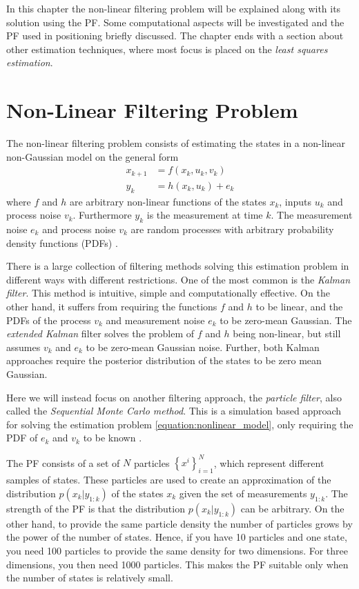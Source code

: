 \documentclass{LTHthesis}
\begin{document}
In this chapter the non-linear filtering problem will be explained along with its solution using the PF. Some computational aspects will be investigated and the PF used in positioning briefly discussed. The chapter ends with a section about other estimation techniques, where most focus is placed on the \emph{least squares estimation}.
%
\section{Non-Linear Filtering Problem}
\label{sec:nlfp}
The non-linear filtering problem consists of estimating the states in a non-linear non-Gaussian model on the general form
%
\begin{subequations}
\label{equation:nonlinear_model}
\begin{align}
x_{k+1} &= f(x_k,u_k,v_k) \label{equation:nonlinear_model_first}\\
y_k&=h(x_k,u_k) + e_k
\label{equation:nonlinear_model_second}
\end{align}
\end{subequations} 
%
where $f$ and $h$ are arbitrary non-linear functions of the states $x_k$, inputs $u_k$ and process noise $v_k$. Furthermore $y_k$ is the measurement at time $k$. The measurement noise $e_k$ and process noise $v_k$ are random processes with arbitrary probability density functions (PDFs) \cite{gson12}. 

There is a large collection of filtering methods solving this estimation problem in different ways with different restrictions. One of the most common is the \emph{Kalman filter}. This method is intuitive, simple and computationally effective. On the other hand, it suffers from requiring the functions $f$ and $h$ to be linear, and the PDFs of the process $v_k$ and measurement noise $e_k$ to be zero-mean Gaussian. The \emph{extended Kalman} filter solves the problem of $f$ and $h$ being non-linear, but still assumes $v_k$ and $e_k$ to be zero-mean Gaussian noise. Further, both Kalman approaches require the posterior distribution of the states to be zero mean Gaussian.

Here we will instead focus on another filtering approach, the \emph{particle filter}, also called the \emph{Sequential Monte Carlo method}. This is a simulation based approach for solving the estimation problem \ref{equation:nonlinear_model}, only requiring the PDF of $e_k$ and $v_k$ to be known \cite{gson12,fig_fra10}.  

The PF consists of a set of $N$ particles $\left\{x^i\right\}_{i=1}^N$, which represent different samples of states. These particles are used to create an approximation of the distribution $p(x_k|y_{1:k})$  of the states $x_k$ given the set of measurements $y_{1:k}$. The strength of the PF is that the distribution $p(x_k|y_{1:k})$ can be arbitrary. On the other hand, to provide the same particle density the number of particles grows by the power of the number of states. Hence, if you have 10 particles and one state, you need 100 particles to provide the same density for two dimensions. For three dimensions, you then need 1000 particles. This makes the PF suitable only when the number of states is relatively small.
%
\end{document}
